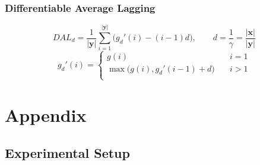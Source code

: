 \documentclass[landscape]{article}
\begin{document}
\subsubsection*{Differentiable Average Lagging}
\begin{equation}\nonumber
	DAL_d = \frac{1}{| \mathbf{y} |} \sum_{i=1}^{| \mathbf{y} |} \bigg(g_d\prime(i) - (i-1)d \bigg), \qquad d = \frac{1}{\gamma} = \frac{| \mathbf{x} |}{| \mathbf{y} |}
\end{equation}
\begin{equation}\nonumber
g_d\prime(i) = \left\{
		\begin{array}{ll}
			g(i) & \quad i = 1\\
			\max \bigg( g(i), g_d\prime(i-1)+d\bigg) & \quad i > 1\\
		\end{array}
	\right.
\end{equation}

\cp
\thispagestyle{empty}
\section*{Appendix}
\vspace*{10mm}
\subsection*{Experimental Setup}
\vspace*{-25mm}
\end{document}
